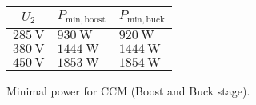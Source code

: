 \begin{solutiontable}[htb]
    \centering  %
    \begin{tabular}{lll}
        \toprule
        \multicolumn{1}{c}{$U_\mathrm{2}$} & \multicolumn{1}{c}{$P_\mathrm{min,boost}$} 
        & \multicolumn{1}{c}{$P_\mathrm{min,buck}$} \\
        \midrule 
        $\SI{285}{\volt}$ & $\SI{930}{\watt}$ & $\SI{920}{\watt}$\\ 
        $\SI{380}{\volt}$ & $\SI{1444}{\watt}$ & $\SI{1444}{\watt}$ \\ 
        $\SI{450}{\volt}$ & $\SI{1853}{\watt}$ & $\SI{1854}{\watt}$\\ 
        \bottomrule
    \end{tabular}
    \caption{Minimal power for CCM (Boost and Buck stage).}
    \label{table:PowerminInputOutputStage}
\end{solutiontable}

